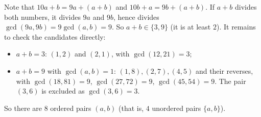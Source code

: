 Note that $10a+b=9a+(a+b)$ and $10b+a=9b+(a+b)$. If $a+b$ divides both numbers, it divides $9a$ and $9b$, hence divides $\gcd(9a,9b)=9\gcd(a,b)=9$. So $a+b\in\{3,9\}$ (it is at least $2$). It remains to check the candidates directly:
\begin{itemize}
\item $a+b=3$: $(1,2)$ and $(2,1)$, with $\gcd(12,21)=3$;
\item $a+b=9$ with $\gcd(a,b)=1$: $(1,8),(2,7),(4,5)$ and their reverses, with $\gcd(18,81)=9$, $\gcd(27,72)=9$, $\gcd(45,54)=9$. The pair $(3,6)$ is excluded as $\gcd(3,6)=3$.
\end{itemize}
So there are $\boxed{8}$ ordered pairs $(a,b)$ (that is, $4$ unordered pairs $\{a,b\}$).
